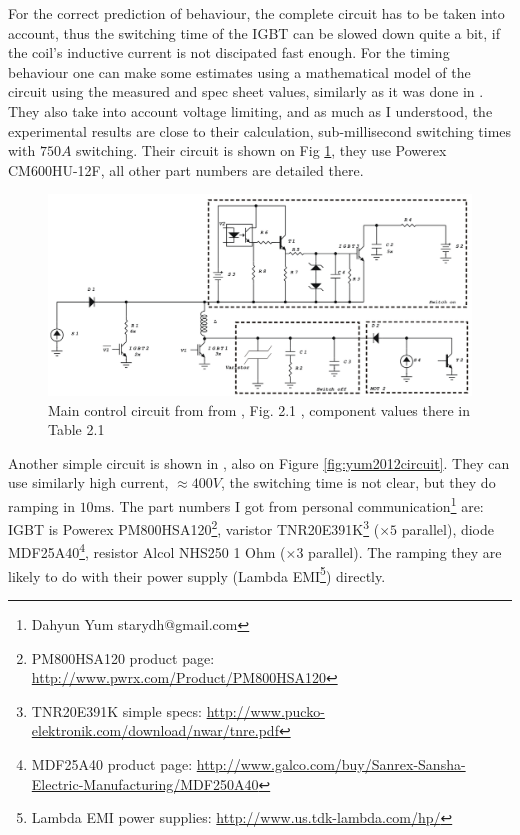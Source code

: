 \documentclass[12pt,a4paper]{article}
\begin{document}
For the correct prediction of behaviour, the complete circuit has to be taken into account, thus the switching time of the IGBT can be slowed down quite a bit, if the coil's inductive current is not discipated fast enough. For the timing behaviour one can make some estimates using a mathematical model of the circuit using the measured and spec sheet values, similarly as it was done in \citet{Deissler2003}. They also take into account voltage limiting, and as much as I understood, the experimental results are close to their calculation, sub-millisecond switching times with $750A$ switching. Their circuit is shown on Fig \ref{fig:deissler}, they use Powerex CM600HU-12F, all other part numbers are detailed there.

\begin{figure}[ht!]
\centering
\includegraphics[width=150mm]{Deissler.png}
\caption{Main control circuit from from \cite{Deissler2003}, Fig. 2.1 , component values there in Table 2.1}
\label{fig:deissler}
\end{figure}

Another simple circuit is shown in \citet{Yum2012}, also on Figure \ref{fig:yum2012circuit}. They can use similarly high current, $\approx 400V$, the switching time is not clear, but they do ramping in $10\mathrm{ms}$. The part numbers I got from personal communication\footnote{Dahyun Yum starydh@gmail.com} are: IGBT is Powerex PM800HSA120\footnote{PM800HSA120 product page: \url{http://www.pwrx.com/Product/PM800HSA120}}, varistor TNR20E391K\footnote{TNR20E391K simple specs: \url{http://www.pucko-elektronik.com/download/nwar/tnre.pdf}} ($\times 5$ parallel), diode MDF25A40\footnote{MDF25A40 product page: \url{http://www.galco.com/buy/Sanrex-Sansha-Electric-Manufacturing/MDF250A40}}, resistor Alcol NHS250 1 Ohm ($\times 3$ parallel). The ramping they are likely to do with their power supply (Lambda EMI\footnote{Lambda EMI power supplies: \url{http://www.us.tdk-lambda.com/hp/}}) directly.
\end{document}

